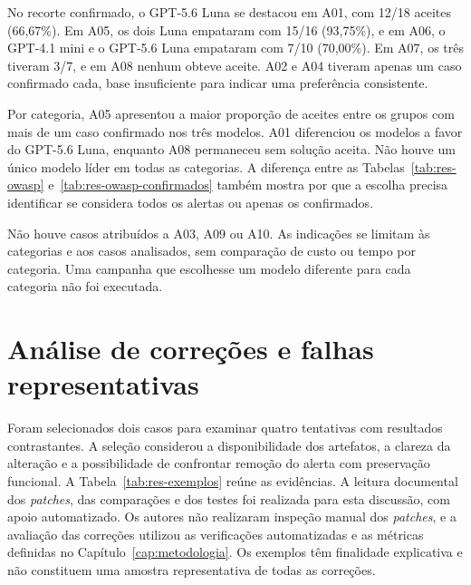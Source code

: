 No recorte confirmado, o GPT-5.6 Luna se destacou em A01, com 12/18 aceites (66,67\%). Em A05, os dois Luna empataram com 15/16 (93,75\%), e em A06, o GPT-4.1 mini e o GPT-5.6 Luna empataram com 7/10 (70,00\%). Em A07, os três tiveram 3/7, e em A08 nenhum obteve aceite. A02 e A04 tiveram apenas um caso confirmado cada, base insuficiente para indicar uma preferência consistente.

Por categoria, A05 apresentou a maior proporção de aceites entre os grupos com mais de um caso confirmado nos três modelos. A01 diferenciou os modelos a favor do GPT-5.6 Luna, enquanto A08 permaneceu sem solução aceita. Não houve um único modelo líder em todas as categorias. A diferença entre as Tabelas~\ref{tab:res-owasp} e~\ref{tab:res-owasp-confirmados} também mostra por que a escolha precisa identificar se considera todos os alertas ou apenas os confirmados.

Não houve casos atribuídos a A03, A09 ou A10. As indicações se limitam às categorias e aos casos analisados, sem comparação de custo ou tempo por categoria. Uma campanha que escolhesse um modelo diferente para cada categoria não foi executada.

\section{Análise de correções e falhas representativas}
\label{sec:res-exemplos}

Foram selecionados dois casos para examinar quatro tentativas com resultados contrastantes. A seleção considerou a disponibilidade dos artefatos, a clareza da alteração e a possibilidade de confrontar remoção do alerta com preservação funcional. A Tabela~\ref{tab:res-exemplos} reúne as evidências. A leitura documental dos \textit{patches}, das comparações e dos testes foi realizada para esta discussão, com apoio automatizado. Os autores não realizaram inspeção manual dos \textit{patches}, e a avaliação das correções utilizou as verificações automatizadas e as métricas definidas no Capítulo~\ref{cap:metodologia}. Os exemplos têm finalidade explicativa e não constituem uma amostra representativa de todas as correções.

